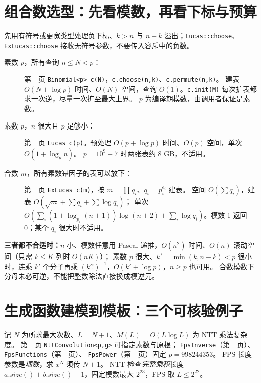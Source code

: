 \section{组合数选型：先看模数，再看下标与预算}\label{knowledge-binomial-choice}
先用有符号或更宽类型处理负下标、$k>n$ 与 $n+k$ 溢出；\texttt{Lucas::choose}、\texttt{ExLucas::choose} 接收无符号参数，不要传入容斥中的负数。
\begin{description}
\item[素数 $p$，所有查询 $n\le N<p$：]
第~\pageref{compact-Binomial}~页 \texttt{Binomial<p> c(N)}，\texttt{c.choose(n,k)}、\texttt{c.permute(n,k)}。
建表 $O(N+\log p)$ 时间、$O(N)$ 空间，查询 $O(1)$。\texttt{c.init(M)} 每次扩表都求一次逆，尽量一次扩至最大上界。
$p$ 为编译期模数，由调用者保证是素数。
\item[素数 $p$，$n$ 很大且 $p$ 足够小：]
第~\pageref{compact-Lucas}~页 \texttt{Lucas c(p)}。预处理 $O(p+\log p)$ 时间、$O(p)$ 空间，单次 $O(1+\log_p n)$。
$p=10^9+7$ 时两张表约 8 GB，不适用。
\item[合数 $m$，所有素数幂因子的表可以放下：]
第~\pageref{compact-ExLucas}~页 \texttt{ExLucas c(m)}，按 $m=\prod q_i$、$q_i=p_i^{e_i}$ 建表。
空间 $O(\sum q_i)$，建表 $O(\sqrt m+\sum q_i+\sum\log q_i)$；
单次 $O(\sum_i(1+\log_{p_i}(n+1))\log(n+2)+\sum_i\log q_i)$。模数 1 返回 0；某个 $q_i$ 很大时不适用。
\end{description}
\textbf{三者都不合适时：}$n$ 小、模数任意用 Pascal 递推，$O(n^2)$ 时间、$O(n)$ 滚动空间（只需 $k\le K$ 列时 $O(nK)$）；
素数 $p$ 很大、$k'=\min(k,n-k)<p$ 很小时，连乘 $k'$ 个分子再乘 $(k'!)^{-1}$，$O(k'+\log p)$，$n\ge p$ 也可用。
合数模数下分母未必可逆，不能把整数除法直接换成模逆元。

\section{生成函数建模到模板：三个可核验例子}\label{knowledge-generating-examples}
记 $N$ 为所求最大次数、$L=N+1$、$M(L)=O(L\log L)$ 为 NTT 乘法复杂度。
第~\pageref{compact-NttConvolution}~页 \texttt{NttConvolution<p,g>} 可指定素数与原根；
\texttt{FpsInverse}（第~\pageref{compact-FpsInverse}~页）、\texttt{FpsFunctions}（第~\pageref{compact-FpsFunctions}~页）、
\texttt{FpsPower}（第~\pageref{compact-FpsPower}~页）固定 $p=998244353$。
FPS 长度参数是\emph{项数}，求 $x^N$ 须传 $N+1$。
NTT 检查\emph{完整乘积}长度 $a.size()+b.size()-1$，固定模数最大 $2^{23}$，FPS 取 $L\le2^{22}$。

